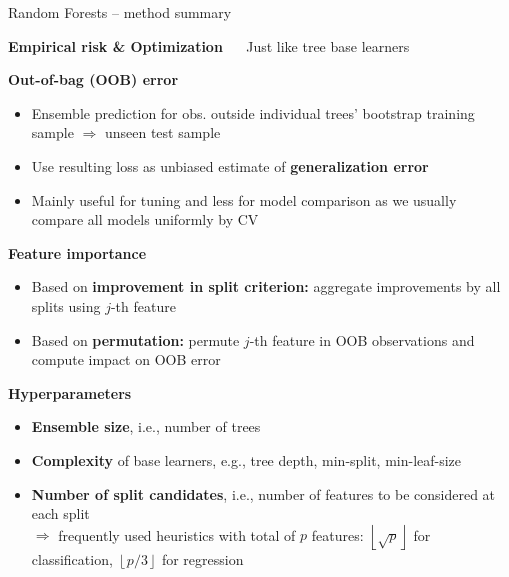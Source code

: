 \documentclass[11pt,compress,t,notes=noshow, xcolor=table]{beamer}
\newcommand{\highlight}[1]{\textcolor{hlcol}{\textbf{#1}}}
\begin{document}
\begin{vbframe}{Random Forests -- method summary}
\framebreak

\highlight{Empirical risk \& Optimization} ~~ Just like tree base learners

\medskip

\highlight{Out-of-bag (OOB) error}
\begin{itemize}
  \item Ensemble prediction for obs. outside individual trees' bootstrap training sample $\Rightarrow$ unseen test sample
  \item Use resulting loss as unbiased estimate of \textbf{generalization error}
  \item Mainly useful for tuning and less for model comparison as we usually compare all models uniformly by CV
\end{itemize}

\medskip

\highlight{Feature importance}

\begin{itemize}
  \item Based on \textbf{improvement in split criterion:} aggregate improvements 
  by all splits using $j$-th feature
  \item Based on \textbf{permutation:} permute $j$-th feature in 
  OOB observations and compute impact on OOB error
\end{itemize}

\medskip

\highlight{Hyperparameters}

\begin{itemize}
  \item \textbf{Ensemble size}, i.e., number of trees
  \item \textbf{Complexity} of base learners, e.g., tree depth, min-split, min-leaf-size
  \item \textbf{Number of split candidates}, i.e., number of features to be considered at each split \\
  $\Rightarrow$ frequently used heuristics with total of $p$ features: 
  $\left \lfloor{\sqrt{p}}\right \rfloor$ for classification, $\left \lfloor{p/3}\right \rfloor$ for regression
\end{itemize}

\end{vbframe}
\end{document}
